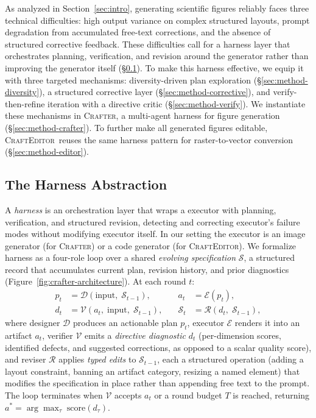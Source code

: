 \documentclass{llmxive}
\providecommand{\Crafter}{\textsc{Crafter}\xspace}
\providecommand{\Editor}{\textsc{CraftEditor}\xspace}
\begin{document}
As analyzed in Section~\ref{sec:intro}, generating scientific figures
reliably faces three technical difficulties: high output variance on
complex structured layouts, prompt degradation from accumulated free-text
corrections, and the absence of structured corrective feedback. These
difficulties call for a harness layer that orchestrates planning,
verification, and revision around the generator rather than improving the
generator itself (\S\ref{sec:method-harness}). To make this harness
effective, we equip it with three targeted mechanisms:
diversity-driven plan exploration (\S\ref{sec:method-diversity}), a
structured corrective layer (\S\ref{sec:method-corrective}), and
verify-then-refine iteration with a directive critic
(\S\ref{sec:method-verify}). We instantiate these mechanisms in
\Crafter, a multi-agent harness for figure generation
(\S\ref{sec:method-crafter}). To further make all generated figures
editable, \Editor\ reuses the same harness pattern for raster-to-vector
conversion (\S\ref{sec:method-editor}).

\subsection{The Harness Abstraction}
\label{sec:method-harness}

A \emph{harness} is an orchestration layer that wraps a executor with planning, verification, and structured revision, detecting and correcting executor's failure modes without modifying executor itself. In our setting the executor is an image generator (for \Crafter) or a code generator (for \Editor).
We formalize harness as a four-role loop over a shared \emph{evolving specification} $\mathcal{S}$, a structured record that accumulates current plan, revision history, and prior diagnostics (Figure~\ref{fig:crafter-architecture}). At each round $t$:
%
\begin{align}
  p_t &= \mathcal{D}(\text{input},\;\mathcal{S}_{t-1}),
  &\quad a_t &= \mathcal{E}(p_t), \label{eq:harness-de}\\
  d_t &= \mathcal{V}(a_t,\;\text{input},\;\mathcal{S}_{t-1}),
  &\quad \mathcal{S}_t &= \mathcal{R}(d_t,\;\mathcal{S}_{t-1}),
  \label{eq:harness-vr}
\end{align}
%
where designer $\mathcal{D}$ produces an actionable plan $p_t$, executor $\mathcal{E}$ renders it into an artifact $a_t$, verifier $\mathcal{V}$ emits a \emph{directive diagnostic} $d_t$ (per-dimension scores, identified defects, and suggested corrections, as opposed to a scalar quality score), and reviser $\mathcal{R}$ applies \emph{typed edits} to $\mathcal{S}_{t-1}$, each a structured operation (adding a layout constraint, banning an artifact category, resizing a named element) that modifies the specification in place rather than appending free text to the prompt. The loop terminates when $\mathcal{V}$ accepts $a_t$ or a round budget $T$ is reached, returning $a^{*}\!=\!\arg\max_\tau\;\mathrm{score}(d_\tau)$.
\end{document}
